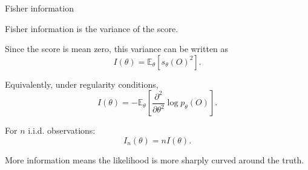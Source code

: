 \documentclass[xcolor={table}, handout]{beamer}
\begin{document}
\note{
\scriptsize \singlespacing

}
\begin{frame}{Fisher information}

\begin{wideitemize}
\item Fisher information is the variance of the score.\pause
\item Since the score is mean zero, this variance can be written as
\[
I(\theta)
  =
  \mathbb{E}_{\theta}[s_\theta(O)^2].
\]\pause
\item Equivalently, under regularity conditions,
\[
I(\theta)
  =
  -\mathbb{E}_{\theta}
  \left[
  \frac{\partial^2}{\partial \theta^2}\log p_\theta(O)
  \right].
\]\pause
\item For $n$ i.i.d. observations:
\[
I_n(\theta)=n I(\theta).
\]\pause
\item More information means the likelihood is more sharply curved around the truth.
\end{wideitemize}

\end{frame}
\end{document}
